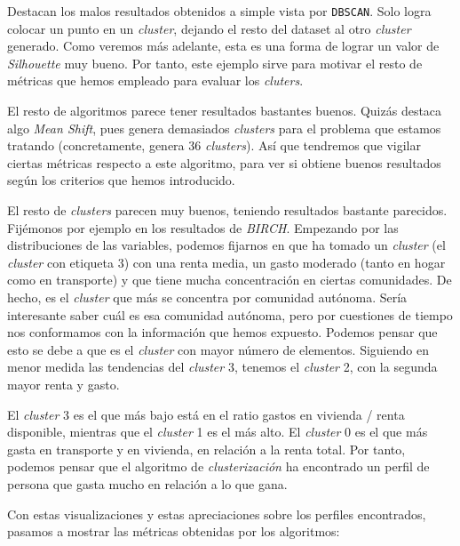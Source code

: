 \documentclass[11pt]{article}
\begin{document}
Destacan los malos resultados obtenidos a simple vista por \lstinline{DBSCAN}. Solo logra colocar un punto en un \emph{cluster}, dejando el resto del dataset al otro \emph{cluster} generado. Como veremos más adelante, esta es una forma de lograr un valor de \emph{Silhouette} muy bueno. Por tanto, este ejemplo sirve para motivar el resto de métricas que hemos empleado para evaluar los \emph{cluters}.

El resto de algoritmos parece tener resultados bastantes buenos. Quizás destaca algo \emph{Mean Shift}, pues genera demasiados \emph{clusters} para el problema que estamos tratando (concretamente, genera 36 \emph{clusters}). Así que tendremos que vigilar ciertas métricas respecto a este algoritmo, para ver si obtiene buenos resultados según los criterios que hemos introducido.

El resto de \emph{clusters} parecen muy buenos, teniendo resultados bastante parecidos. Fijémonos por ejemplo en los resultados de \emph{BIRCH}. Empezando por las distribuciones de las variables, podemos fijarnos en que ha tomado un \emph{cluster} (el \emph{cluster} con etiqueta 3) con una renta media, un gasto moderado (tanto en hogar como en transporte) y que tiene mucha concentración en ciertas comunidades. De hecho, es el \emph{cluster} que más se concentra por comunidad autónoma. Sería interesante saber cuál es esa comunidad autónoma, pero por cuestiones de tiempo nos conformamos con la información que hemos expuesto. Podemos pensar que esto se debe a que es el \emph{cluster} con mayor número de elementos. Siguiendo en menor medida las tendencias del \emph{cluster} 3, tenemos el \emph{cluster} 2, con la segunda mayor renta y gasto.

El \emph{cluster} 3 es el que más bajo está en el ratio gastos en vivienda / renta disponible, mientras que el \emph{cluster} 1 es el más alto. El \emph{cluster} 0 es el que más gasta en transporte y en vivienda, en relación a la renta total. Por tanto, podemos pensar que el algoritmo de \emph{clusterización} ha encontrado un perfil de persona que gasta mucho en relación a lo que gana.

Con estas visualizaciones y estas apreciaciones sobre los perfiles encontrados, pasamos a mostrar las métricas obtenidas por los algoritmos:
\end{document}
